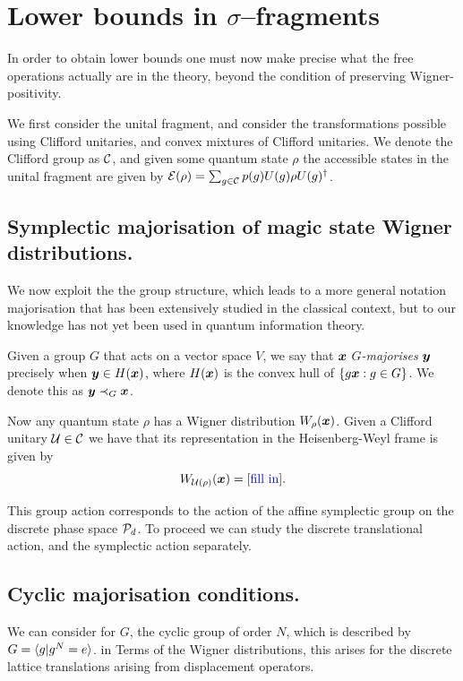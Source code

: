 \documentclass[pra,
aps,
twocolumn,
superscriptaddress,
groupedaddress,
nofootinbib,
reprint
]{revtex4-1}
\begin{document}
\section{Lower bounds in $\sigma$--fragments}

In order to obtain lower bounds one must now make precise what the free operations actually are in the  theory, beyond the condition of preserving Wigner-positivity.

We first consider the unital fragment, and consider the transformations possible using Clifford unitaries, and convex mixtures of Clifford unitaries. We denote the Clifford group as $\C$, and given some quantum state $\rho$ the accessible states in the unital fragment are given by $\E(\rho) = \sum_{g \in \C} p(g) U(g) \rho U(g)^\dagger$.

\subsection{Symplectic majorisation of magic state Wigner distributions.}
We now exploit the the group structure, which leads to a more general notation majorisation that has been extensively studied in the classical context, but to our knowledge has not yet been used in quantum information theory.

\begin{definition} Given a group $G$ that acts on a vector space $V$, we say that $\bmx$ \emph{$G$-majorises} $\bmy$ precisely when $\y \in H(\x)$, where $H(\x)$ is the convex hull of $\{g \x : g \in G\}$. We denote this as $\y \prec_G \x$.
\end{definition}

Now any quantum state $\rho$ has a Wigner distribution $W_\rho(\x)$. Given a Clifford unitary $\U \in \C$ we have that its representation in the Heisenberg-Weyl frame is given by
\begin{equation}
W_{\U(\rho)} (\x) = [\mbox{\ddd{fill in}}].
\end{equation}

This group action corresponds to the action of the affine symplectic group on the discrete phase space $\P_d$. To proceed we can study the discrete translational action, and the symplectic action separately.

\subsection{Cyclic majorisation conditions.}
We can consider for $G$, the cyclic group of order $N$, which is described by $G= \< g | g^N = e\>$. in Terms of the Wigner distributions, this arises for the discrete lattice translations arising from displacement operators.
\end{document}
